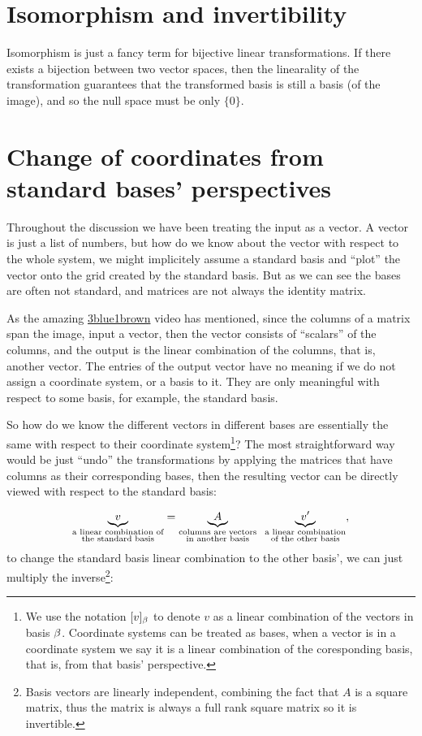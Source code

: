 \documentclass[11pt, cyan, night, 1in]{LatexTemplate/hw}
\begin{document}
\section{Isomorphism and invertibility}

Isomorphism is just a fancy term for bijective linear transformations. If there exists a bijection between two vector spaces, then the linearality of the transformation guarantees that the transformed basis is still a basis (of the image), and so the null space must be only $\{0\}$.

\section{Change of coordinates from standard bases' perspectives}

Throughout the discussion we have been treating the input as a vector. A vector is just a list of numbers, but how do we know about the vector with respect to the whole system, we might implicitely assume a standard basis and ``plot'' the vector onto the grid created by the standard basis. But as we can see the bases are often not standard, and matrices are not always the identity matrix.

As the amazing \hyperlink{https://www.youtube.com/watch?v=P2LTAUO1TdA}{3blue1brown} video has mentioned, since the columns of a matrix span the image, input a vector, then the vector consists of ``scalars'' of the columns, and the output is the linear combination of the columns, that is, another vector. The entries of the output vector have no meaning if we do not assign a coordinate system, or a basis to it. They are only meaningful with respect to some basis, for example, the standard basis.

So how do we know the different vectors in different bases are essentially the same with respect to their coordinate system\footnote{We use the notation $[v]_\beta$ to denote $v$ as a linear combination of the vectors in basis $\beta$. Coordinate systems can be treated as bases, when a vector is in a coordinate system we say it is a linear combination of the coresponding basis, that is, from that basis' perspective.}? The most straightforward way would be just ``undo'' the transformations by applying the matrices that have columns as their corresponding bases, then the resulting vector can be directly viewed with respect to the standard basis:

\[\underbrace{v}_{\substack{\text{a linear combination of} \\\text{the standard basis}}} = \underbrace{A}_{\substack{\text{columns are vectors}\\\text{in another basis}}}\;\;\underbrace{v'}_{\substack{\text{a linear combination}\\\text{of the other basis}}},\] to change the standard basis linear combination to the other basis', we can just multiply the inverse\footnote{Basis vectors are linearly independent, combining the fact that $A$ is a square matrix, thus the matrix is always a full rank square matrix so it is invertible.}:
\end{document}
